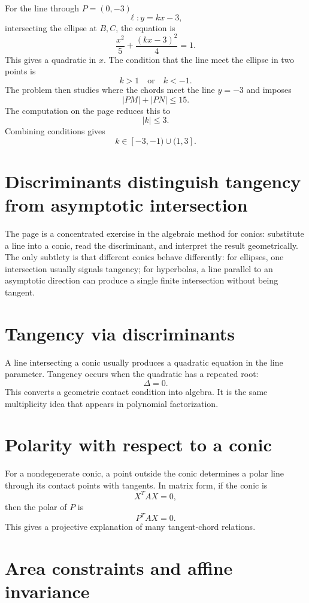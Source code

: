 For the line through \(P=(0,-3)\)
\[
  \ell:y=kx-3,
\]
intersecting the ellipse at \(B,C\), the equation is
\[
  \frac{x^2}{5}+\frac{(kx-3)^2}{4}=1.
\]
This gives a quadratic in \(x\).  The condition that the line meet the ellipse in two points is
\[
  k>1\quad\text{or}\quad k<-1.
\]
The problem then studies where the chords meet the line \(y=-3\) and imposes
\[
  |PM|+|PN|\le15.
\]
The computation on the page reduces this to
\[
  |k|\le3.
\]
Combining conditions gives
\[
  k\in[-3,-1)\cup(1,3].
\]

\section{Discriminants distinguish tangency from asymptotic intersection}

The page is a concentrated exercise in the algebraic method for conics: substitute a line into a conic, read the discriminant, and interpret the result geometrically.  The only subtlety is that different conics behave differently: for ellipses, one intersection usually signals tangency; for hyperbolas, a line parallel to an asymptotic direction can produce a single finite intersection without being tangent.

\section{Tangency via discriminants}

A line intersecting a conic usually produces a quadratic equation in the line parameter.  Tangency occurs when the quadratic has a repeated root:
\[
  \Delta=0.
\]
This converts a geometric contact condition into algebra.  It is the same multiplicity idea that appears in polynomial factorization.

\section{Polarity with respect to a conic}

For a nondegenerate conic, a point outside the conic determines a polar line through its contact points with tangents.  In matrix form, if the conic is
\[
  X^TAX=0,
\]
then the polar of \(P\) is
\[
  P^TAX=0.
\]
This gives a projective explanation of many tangent-chord relations.

\section{Area constraints and affine invariance}

